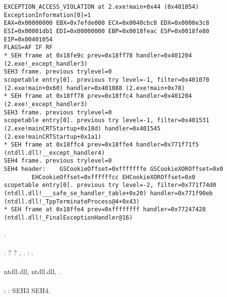 \begin{lstlisting}[caption=tracer.exe output]
EXCEPTION_ACCESS_VIOLATION at 2.exe!main+0x44 (0x401054) ExceptionInformation[0]=1
EAX=0x00000000 EBX=0x7efde000 ECX=0x0040cbc8 EDX=0x0008e3c8
ESI=0x00001db1 EDI=0x00000000 EBP=0x0018feac ESP=0x0018fe80
EIP=0x00401054
FLAGS=AF IF RF
* SEH frame at 0x18fe9c prev=0x18ff78 handler=0x401204 (2.exe!_except_handler3)
SEH3 frame. previous trylevel=0
scopetable entry[0]. previous try level=-1, filter=0x401070 (2.exe!main+0x60) handler=0x401088 (2.exe!main+0x78)
* SEH frame at 0x18ff78 prev=0x18ffc4 handler=0x401204 (2.exe!_except_handler3)
SEH3 frame. previous trylevel=0
scopetable entry[0]. previous try level=-1, filter=0x401531 (2.exe!mainCRTStartup+0x18d) handler=0x401545 (2.exe!mainCRTStartup+0x1a1)
* SEH frame at 0x18ffc4 prev=0x18ffe4 handler=0x771f71f5 (ntdll.dll!__except_handler4)
SEH4 frame. previous trylevel=0
SEH4 header:	GSCookieOffset=0xfffffffe GSCookieXOROffset=0x0
		EHCookieOffset=0xffffffcc EHCookieXOROffset=0x0
scopetable entry[0]. previous try level=-2, filter=0x771f74d0 (ntdll.dll!___safe_se_handler_table+0x20) handler=0x771f90eb (ntdll.dll!_TppTerminateProcess@4+0x43)
* SEH frame at 0x18ffe4 prev=0xffffffff handler=0x77247428 (ntdll.dll!_FinalExceptionHandler@16)
\end{lstlisting}

.\\
\\
. ?
?
, 
.
: .\\
\\
 ntdll.dll, 
 ntdll.dll,
.\\
\\
:
: SEH3 \AndENRU SEH4.

